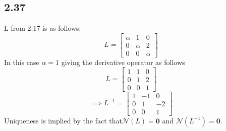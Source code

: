 \documentclass[letterpaper,12pt]{article}
\theoremstyle{definition}
\begin{document}
\subsection*{2.37}
L from 2.17 is as follows:
\[L = 
    \begin{bmatrix}
        \alpha & 1 & 0 \\
        0 & \alpha & 2 \\
        0 & 0 & \alpha 
    \end{bmatrix}
\]
In this case $\alpha=1$ giving the derivative operator as follows
\[L = 
    \begin{bmatrix}
        1 & 1 & 0 \\
        0 & 1 & 2 \\
        0 & 0 & 1 
    \end{bmatrix}
\]
\[\implies L^{-1} = 
    \begin{bmatrix}
        1 & -1 & 0 \\
        0 & 1 & -2\\
        0 & 0 & 1 
    \end{bmatrix}
\]
Uniqueness is implied by the fact that$\mathscr{N}(L) = \textbf{0}$ and $\mathscr{N}(L^{-1}) = \textbf{0}$.
\end{document}
